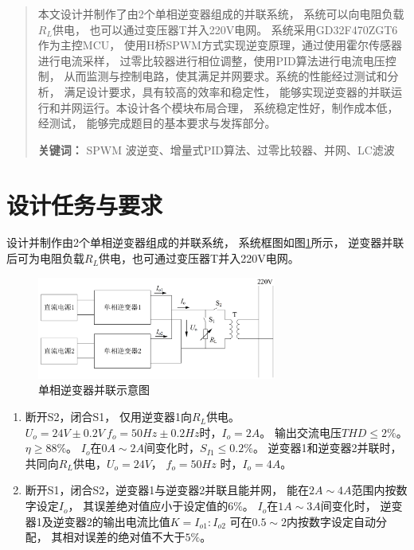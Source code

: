 \documentclass[a4paper,12pt]{article}
\begin{document}



\newpage
\begin{abstract}
本文设计并制作了由2个单相逆变器组成的并联系统，
系统可以向电阻负载$R_L$供电，
也可以通过变压器T并入220V电网。
系统采用GD32F470ZGT6作为主控MCU，
使用H桥SPWM方式实现逆变原理，通过使用霍尔传感器进行电流采样，
过零比较器进行相位调整，使用PID算法进行电流电压控制，
从而监测与控制电路，使其满足并网要求。系统的性能经过测试和分析，
满足设计要求，具有较高的效率和稳定性，
能够实现逆变器的并联运行和并网运行。本设计各个模块布局合理，
系统稳定性好，制作成本低，经测试，
能够完成题目的基本要求与发挥部分。


\noindent \textbf{关键词：} 
SPWM 波逆变、增量式PID算法、过零比较器、并网、LC滤波
\end{abstract}

\newpage

\tableofcontents

\newpage

\section{设计任务与要求}
设计并制作由2个单相逆变器组成的并联系统，
系统框图如图\ref{fig1}所示，
逆变器并联后可为电阻负载$R_L$供电，也可通过变压器T并入220V电网。
\begin{figure}[htbp]
\centering
\includegraphics[width=0.7\textwidth]{src/fig1.png}
\caption{单相逆变器并联示意图}
\label{fig1}
\end{figure}
\begin{enumerate}
    \item 断开S2，闭合S1，
    仅用逆变器1向$R_L$供电。$U_o=24V\pm0.2V\  f_o=50Hz\pm0.2Hz$时，$I_o=2A$。
    输出交流电压$THD\leqslant 2\%$。$\eta\geqslant 88\%$。
    $I_o$在$0A\sim 2A$间变化时，$S_{I1}\leqslant 0.2\%$。
    逆变器1和逆变器2并联时，
    共同向$R_L$供电，$U_o=24V$， $f_o=50Hz$ 时，$I_o=4A$。
    \item 断开S1，闭合S2，逆变器1与逆变器2并联且能并网，
    能在$2A\sim4A$范围内按数字设定$I_o$，
    其误差绝对值应小于设定值的$6\%$。
    $I_o$在$1A\sim 3A$间变化时，
    逆变器1及逆变器2的输出电流比值$K=I_{o1}:I_{o2}$
    可在$0.5\sim 2$内按数字设定自动分配，
    其相对误差的绝对值不大于$5\%$。
\end{enumerate}
\end{document}
